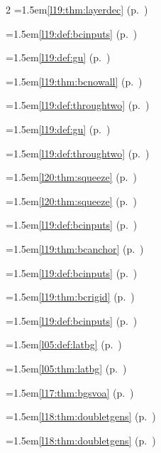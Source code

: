 \begin{multicols}{2}
\hangindent=1.5em\quad \ref{l19:thm:layerdec} (p.~\pageref{l19:thm:layerdec})\par
\hangindent=1.5em\quad \ref{l19:def:bcinputs} (p.~\pageref{l19:def:bcinputs})\par
\hangindent=1.5em\quad \ref{l19:def:gu} (p.~\pageref{l19:def:gu})\par
\hangindent=1.5em\quad \ref{l19:thm:bcnowall} (p.~\pageref{l19:thm:bcnowall})\par
\hangindent=1.5em\quad \ref{l19:def:throughtwo} (p.~\pageref{l19:def:throughtwo})\par
\hangindent=1.5em\quad \ref{l19:def:gu} (p.~\pageref{l19:def:gu})\par
\hangindent=1.5em\quad \ref{l19:def:throughtwo} (p.~\pageref{l19:def:throughtwo})\par
\hangindent=1.5em\quad \ref{l20:thm:squeeze} (p.~\pageref{l20:thm:squeeze})\par
\hangindent=1.5em\quad \ref{l20:thm:squeeze} (p.~\pageref{l20:thm:squeeze})\par
\hangindent=1.5em\quad \ref{l19:def:bcinputs} (p.~\pageref{l19:def:bcinputs})\par
\hangindent=1.5em\quad \ref{l19:thm:bcanchor} (p.~\pageref{l19:thm:bcanchor})\par
\hangindent=1.5em\quad \ref{l19:def:bcinputs} (p.~\pageref{l19:def:bcinputs})\par
\hangindent=1.5em\quad \ref{l19:thm:bcrigid} (p.~\pageref{l19:thm:bcrigid})\par
\hangindent=1.5em\quad \ref{l19:def:bcinputs} (p.~\pageref{l19:def:bcinputs})\par
\hangindent=1.5em\quad \ref{l05:def:latbg} (p.~\pageref{l05:def:latbg})\par
\hangindent=1.5em\quad \ref{l05:thm:latbg} (p.~\pageref{l05:thm:latbg})\par
\hangindent=1.5em\quad \ref{l17:thm:bgsvoa} (p.~\pageref{l17:thm:bgsvoa})\par
\hangindent=1.5em\quad \ref{l18:thm:doubletgens} (p.~\pageref{l18:thm:doubletgens})\par
\hangindent=1.5em\quad \ref{l18:thm:doubletgens} (p.~\pageref{l18:thm:doubletgens})\par

\end{multicols}
